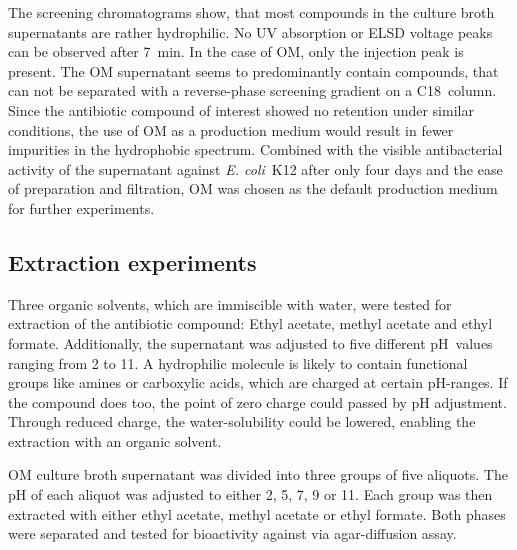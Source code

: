 The screening chromatograms show, that most compounds in the culture broth supernatants are rather hydrophilic.
No UV absorption or ELSD voltage peaks can be observed after \SI{7}{\minute}.
In the case of OM, only the injection peak is present.
The OM supernatant seems to predominantly contain compounds, that can not be separated with a reverse-phase screening gradient on a C18~column.
Since the antibiotic compound of interest showed no retention under similar conditions, the use of OM as a production medium would result in fewer impurities in the hydrophobic spectrum.
Combined with the visible antibacterial activity of the supernatant against \textit{E. coli}~K12 after only four days and the ease of preparation and filtration, OM was chosen as the default production medium for further experiments.

\subsection{Extraction experiments}
\label{sub:extraction_experiments}

Three organic solvents, which are immiscible with water, were tested for extraction of the antibiotic compound:
Ethyl acetate, methyl acetate and ethyl formate.
Additionally, the supernatant was adjusted to five different pH~values ranging from 2 to 11.
A hydrophilic molecule is likely to contain functional groups like amines or carboxylic acids, which are charged at certain pH-ranges. If the compound does too, the point of zero charge could passed by pH adjustment.
Through reduced charge, the water-solubility could be lowered, enabling the extraction with an organic solvent.

OM culture broth supernatant was divided into three groups of five aliquots.
The pH of each aliquot was adjusted to either 2, 5, 7, 9 or 11. 
Each group was then extracted with either ethyl acetate, methyl acetate or ethyl formate. 
Both phases were separated and tested for bioactivity against \coli{} via agar-diffusion assay.

